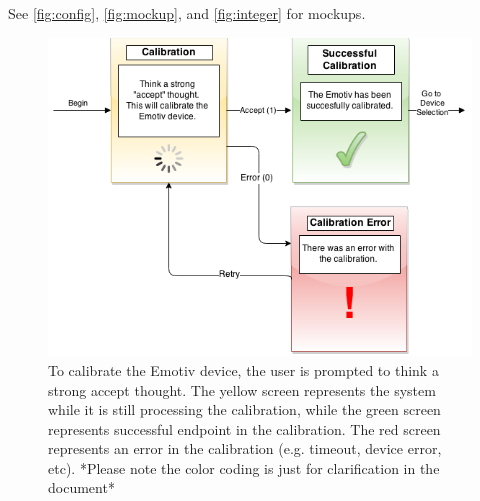 \documentclass{article}
\begin{document}
See \autoref{fig:config}, \autoref{fig:mockup}, and  \autoref{fig:integer} for mockups.
\begin{figure}
	\includegraphics[width=\textwidth]{ConfigurationUI_srs_final.png}
	
	\caption{To calibrate the Emotiv device, the user is prompted to think a strong accept thought. The yellow screen represents the system while it is still processing the calibration, while the green screen represents successful endpoint in the calibration. The red screen represents an error in the calibration (e.g. timeout, device error, etc). *Please note the color coding is just for clarification in the document*}
	\label{fig:config}
\end{figure}
\end{document}
